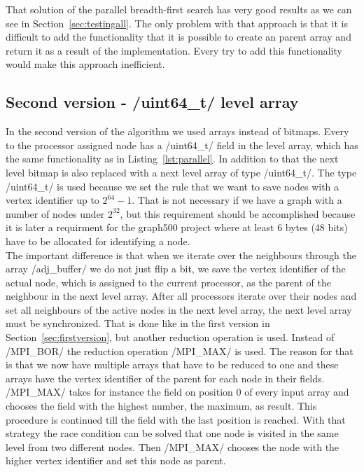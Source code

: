 \documentclass[12pt,a4paper]{article}
\begin{document}
That solution of the parallel breadth-first search has very good results as we can see in Section~\ref{sec:testingall}. The only problem with that approach is that it is difficult to add the functionality that it is possible to create an parent array and return it as a result of the implementation. Every try to add this functionality would make this approach inefficient.

\subsection{Second version - \cinline/uint64_t/ level array}
\label{sec:secondversion}

In the second version of the algorithm we used arrays instead of bitmaps. Every to the processor assigned node has a \cinline/uint64_t/ field in the level array, which has the same functionality as in Listing~\ref{lst:parallel}. In addition to that the next level bitmap is also replaced with a next level array of type \cinline/uint64_t/. The type \cinline/uint64_t/ is used because we set the rule that we want to save nodes with a vertex identifier up to \(2^{64}-1\). That is not necessary if we have a graph with a number of nodes under \(2^{32}\), but this requirement should be accomplished because it is later a requirment for the graph500 project where at least 6 bytes (48 bits) have to be allocated for identifying a node.\\
The important difference is that when we iterate over the neighbours through the array \cinline/adj_buffer/ we do not just flip a bit, we save the vertex identifier of the actual node, which is assigned to the current processor, as the parent of the neighbour in the next level array. After all processors iterate over their nodes and set all neighbours of the active nodes in the next level array, the next level array must be synchronized. That is done like in the first version in Section~\ref{sec:firstversion}, but another reduction operation is used. Instead of \cinline/MPI_BOR/ the reduction operation \cinline/MPI_MAX/ is used. The reason for that is that we now have multiple arrays that have to be reduced to one and these arrays have the vertex identifier of the parent for each node in their fields. \cinline/MPI_MAX/ takes for instance the field on position 0 of every input array and chooses the field with the highest number, the maximum, as result. This procedure is continued till the field with the last position is reached. With that strategy the race condition can be solved that one node is visited in the same level from two different nodes. Then \cinline/MPI_MAX/ chooses the node with the higher vertex identifier and set this node as parent.\\
\end{document}
